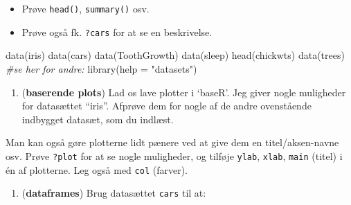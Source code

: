 \documentclass[
]{book}
\newenvironment{Shaded}{\begin{snugshade}}{\end{snugshade}}
\newcommand{\AttributeTok}[1]{\textcolor[rgb]{0.77,0.63,0.00}{#1}}
\newcommand{\CommentTok}[1]{\textcolor[rgb]{0.56,0.35,0.01}{\textit{#1}}}
\newcommand{\FunctionTok}[1]{\textcolor[rgb]{0.00,0.00,0.00}{#1}}
\newcommand{\NormalTok}[1]{#1}
\newcommand{\SpecialCharTok}[1]{\textcolor[rgb]{0.00,0.00,0.00}{#1}}
\newcommand{\StringTok}[1]{\textcolor[rgb]{0.31,0.60,0.02}{#1}}
\providecommand{\tightlist}{%
  \setlength{\itemsep}{0pt}\setlength{\parskip}{0pt}}
\begin{document}
\begin{itemize}
\tightlist
\item
  Prøve \texttt{head()}, \texttt{summary()} osv.
\item
  Prøve også fk. \texttt{?cars} for at se en beskrivelse.
\end{itemize}

\begin{Shaded}
\begin{Highlighting}[]
\FunctionTok{data}\NormalTok{(iris)}
\FunctionTok{data}\NormalTok{(cars)}
\FunctionTok{data}\NormalTok{(ToothGrowth)}
\FunctionTok{data}\NormalTok{(sleep)}
\FunctionTok{head}\NormalTok{(chickwts)}
\FunctionTok{data}\NormalTok{(trees)}
\CommentTok{\#se her for andre:}
\FunctionTok{library}\NormalTok{(}\AttributeTok{help =} \StringTok{"datasets"}\NormalTok{)}
\end{Highlighting}
\end{Shaded}

\begin{enumerate}
\def\labelenumi{\arabic{enumi})}
\setcounter{enumi}{3}
\tightlist
\item
  (\textbf{baserende plots}) Lad os lave plotter i `baseR'. Jeg giver nogle muligheder for datasættet ``iris''. Afprøve dem for nogle af de andre ovenstående indbygget datasæt, som du indlæst.
\end{enumerate}

\begin{Shaded}
\end{Shaded}

Man kan også gøre plotterne lidt pænere ved at give dem en titel/aksen-navne osv. Prøve \texttt{?plot} for at se nogle muligheder, og tilføje \texttt{ylab}, \texttt{xlab}, \texttt{main} (titel) i én af plotterne. Leg også med \texttt{col} (farver).

\begin{enumerate}
\def\labelenumi{\arabic{enumi})}
\setcounter{enumi}{4}
\tightlist
\item
  (\textbf{dataframes}) Brug datasættet \texttt{cars} til at:
\end{enumerate}
\end{document}
